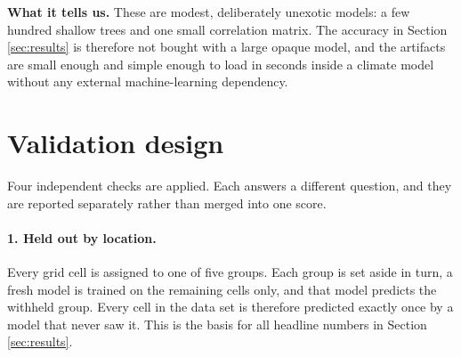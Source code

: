 \documentclass[11pt]{article}
\begin{document}
\begin{table}[h]
{\textbf{What it tells us.} These are modest, deliberately unexotic models: a few hundred shallow trees and one small correlation matrix. The accuracy in Section \ref{sec:results} is therefore not bought with a large opaque model, and the artifacts are small enough and simple enough to load in seconds inside a climate model without any external machine-learning dependency.}
\label{tab:dims}
\small
{}
\end{table}

\section{Validation design}
\label{sec:validation}

Four independent checks are applied. Each answers a different question, and they are reported separately rather than merged into one score.

\paragraph{1. Held out by location.} Every grid cell is assigned to one of five groups. Each group is set aside in turn, a fresh model is trained on the remaining cells only, and that model predicts the withheld group. Every cell in the data set is therefore predicted exactly once by a model that never saw it. This is the basis for all headline numbers in Section \ref{sec:results}.
\end{document}
